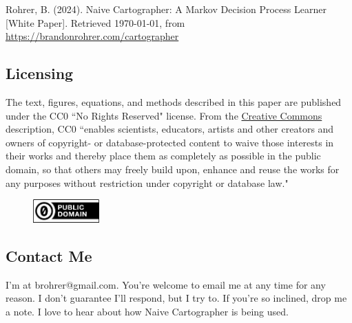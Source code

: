 Rohrer, B. (2024). Naive Cartographer: A Markov Decision Process Learner [White Paper].
Retrieved \today, from
\href{https://brandonrohrer.com/cartographer}{https://brandonrohrer.com/cartographer}


\subsection{Licensing}
\label{subsec:license}

The text, figures, equations, and methods described in this paper
are published under the CC0 ``No Rights Reserved" license.
From the
\href{https://creativecommons.org/public-domain/cc0/}{Creative Commons} description,
CC0 ``enables scientists, educators,
artists and other creators and owners of copyright- or database-protected
content to waive those interests in their works and thereby place them as
completely as possible in the public domain, so that others may freely
build upon, enhance and reuse the works for any purposes without restriction
under copyright or database law."

\begin{figure}[ht]
\vskip 0.2in
\begin{center}
\centerline{\includegraphics[width=1.0in]{images/cc-zero.png}}
\label{fig:cc0}
\end{center}
\vskip -0.2in
\end{figure}

\subsection{Contact Me}
\label{subsec:contact}

I'm at brohrer@gmail.com. You're welcome to email me at any time for
any reason. I don't guarantee I'll respond, but I try to.
If you're so inclined, drop me a note.
I love to hear about how
Naive Cartographer is being used.
